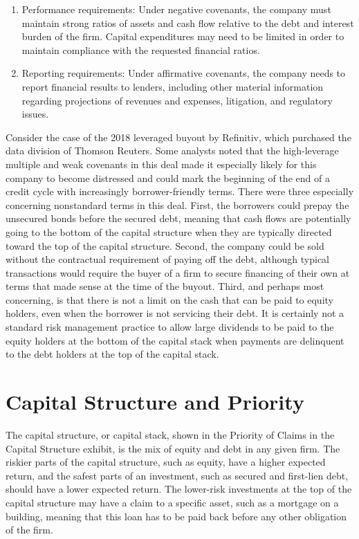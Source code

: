 \documentclass[11pt]{article}
\begin{document}
\begin{enumerate}
  \item Performance requirements: Under negative covenants, the company must maintain strong ratios of assets and cash flow relative to the debt and interest burden of the firm. Capital expenditures may need to be limited in order to maintain compliance with the requested financial ratios.

  \item Reporting requirements: Under affirmative covenants, the company needs to report financial results to lenders, including other material information regarding projections of revenues and expenses, litigation, and regulatory issues.

\end{enumerate}

Consider the case of the 2018 leveraged buyout by Refinitiv, which purchased the data division of Thomson Reuters. Some analysts noted that the high-leverage multiple and weak covenants in this deal made it especially likely for this company to become distressed and could mark the beginning of the end of a credit cycle with increasingly borrower-friendly terms. There were three especially concerning nonstandard terms in this deal. First, the borrowers could prepay the unsecured bonds before the secured debt, meaning that cash flows are potentially going to the bottom of the capital structure when they are typically directed toward the top of the capital structure. Second, the company could be sold without the contractual requirement of paying off the debt, although typical transactions would require the buyer of a firm to secure financing of their own at terms that made sense at the time of the buyout. Third, and perhaps most concerning, is that there is not a limit on the cash that can be paid to equity holders, even when the borrower is not servicing their debt. It is certainly not a standard risk management practice to allow large dividends to be paid to the equity holders at the bottom of the capital stack when payments are delinquent to the debt holders at the top of the capital stack.

\section*{Capital Structure and Priority}
The capital structure, or capital stack, shown in the Priority of Claims in the Capital Structure exhibit, is the mix of equity and debt in any given firm. The riskier parts of the capital structure, such as equity, have a higher expected return, and the safest parts of an investment, such as secured and first-lien debt, should have a lower expected return. The lower-risk investments at the top of the capital structure may have a claim to a specific asset, such as a mortgage on a building, meaning that this loan has to be paid back before any other obligation of the firm.
\end{document}
